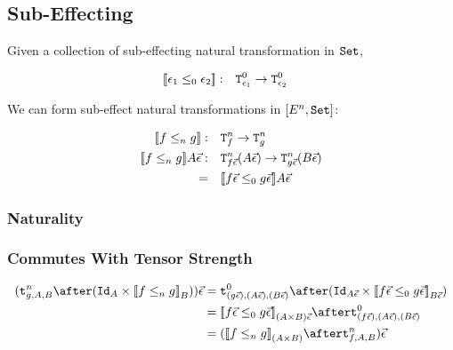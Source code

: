 \documentclass{report}
\begin{document}
\subsection{Sub-Effecting}
Given a collection of sub-effecting natural transformation in $\texttt{Set}$,

\begin{align}
    {\bf [\![}\epsilon_1\leq_0 \epsilon_2{\bf ]\!]}:&\quad \texttt{T}^0_{\epsilon_1} \rightarrow \texttt{T}^0_{\epsilon_2}
\end{align}

We can form sub-effect natural transformations in $[E^n, \texttt{Set}]$:

\begin{align}
    {\bf [\![}f\leq_n g{\bf ]\!]}:&\quad\texttt{T}^n_{f}\rightarrow \texttt{T}^n_{g}\\
    {\bf [\![}f\leq_n g{\bf ]\!]} A \vec{\epsilon}:&\quad\texttt{T}^n_{f\vec{\epsilon}}(A\vec{\epsilon})\rightarrow \texttt{T}^n_{g\vec{\epsilon}}(B\vec{\epsilon})\\
    =&\quad {\bf [\![}f\vec{\epsilon}\leq_0 g\vec{\epsilon}{\bf ]\!]}A\vec{\epsilon}
\end{align}

\subsubsection{Naturality}


\subsubsection{Commutes With Tensor Strength}


\begin{align}
    (\tstrengthn{g}{A}{B}\after(\Id{A}\times \db{f\subeffectn g}_B))\ev & = \tstrengthz{(g\ev)}{(A\ev)}{(B\ev)}\after(\Id{A\ev}\times \db{f\ev \subeffectz g\ev}_{B\ev})\\
    & = \db{f\ev \subeffectz g\ev}_{(A\times B)\ev} \after\tstrengthz{(f\ev)}{(A\ev)}{(B\ev)}\\
    & = (\db{f \subeffectn g}_{(A\times B)} \after\tstrengthn{f}{A}{B})\ev\\
\end{align}
\end{document}
